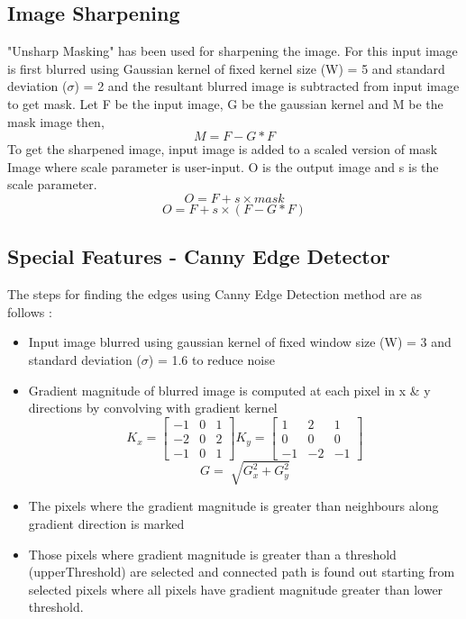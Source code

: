 \documentclass[letterpaper, 10 pt, conference]{ieeeconf}  %
\begin{document}
\subsection{\textbf{Image Sharpening}}
"Unsharp Masking" has been used for sharpening the image. For this input image is first blurred using Gaussian kernel of fixed kernel size (W) = 5 and standard deviation ($\sigma$) = 2 and the resultant blurred image is subtracted from input image to get mask. Let F be the input image, G be the gaussian kernel and M be the mask image then, 
\[M = F - G*F\]
To get the sharpened image, input image is added to a scaled version of mask Image where scale parameter is user-input. O is the output image and s is the scale parameter.
\[O = F + s\times mask \]
\[O = F + s\times(F - G*F)\]

\subsection{\textbf{Special Features - Canny Edge Detector} }
The steps for finding the edges using Canny Edge Detection method are as follows :
\begin{itemize}
\item Input image blurred using gaussian kernel of fixed window size (W) = 3 and standard deviation ($\sigma$) = 1.6 to reduce noise
\item Gradient magnitude  of blurred image is computed at each pixel in x \& y directions by convolving with gradient kernel 
\[ K_{x} = \begin{bmatrix}
    -1 & 0 & 1 \\
    -2 & 0 & 2 \\
    -1 & 0 & 1
  \end{bmatrix} 
  K_{y} = \begin{bmatrix}
    1 & 2 & 1 \\
    0 & 0 & 0 \\
    -1 & -2 & -1
  \end{bmatrix}\]
  \[ G = \sqrt[]{G_{x}^2 + G_{y}^2}\]
\item The pixels where the gradient magnitude is greater than neighbours along gradient direction is marked
\item Those pixels where gradient magnitude is greater than a threshold (upperThreshold) are selected and connected path is found out starting from selected pixels where all pixels have gradient magnitude greater than lower threshold.
\end{itemize}
\end{document}

